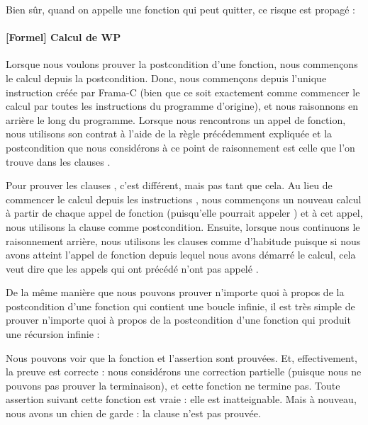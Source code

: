

Bien sûr, quand on appelle une fonction qui peut quitter, ce risque est propagé :




\paragraph*{[Formel] Calcul de WP}


Lorsque nous voulons prouver la postcondition d'une fonction, nous commençons le
calcul depuis la postcondition. Donc, nous commençons depuis l'unique instruction
 créée par Frama-C (bien que ce soit exactement comme
commencer le calcul par toutes les instructions  du programme
d'origine), et nous raisonnons en arrière le long du programme. Lorsque nous
rencontrons un appel de fonction, nous utilisons son contrat à l'aide de la
règle précédemment expliquée et la postcondition que nous considérons à ce
point de raisonnement est celle  que l'on trouve dans les clauses
.


Pour prouver les clauses , c'est différent, mais pas tant que
cela. Au lieu de commencer le calcul depuis les instructions ,
nous commençons un nouveau calcul à partir de chaque appel de fonction
(puisqu'elle pourrait appeler ) et à cet appel, nous utilisons
la clause  comme postcondition. Ensuite, lorsque nous
continuons le raisonnement arrière, nous utilisons les clauses
 comme d'habitude puisque si nous avons atteint l'appel de
fonction depuis lequel nous avons démarré le calcul, cela veut dire que les
appels qui ont précédé n'ont pas appelé .



De la même manière que nous pouvons prouver n'importe quoi à propos de la
postcondition d'une fonction qui contient une boucle infinie, il est très simple
de prouver n'importe quoi à propos de la postcondition d'une fonction qui
produit une récursion infinie :






Nous pouvons voir que la fonction et l'assertion sont prouvées. Et, effectivement,
la preuve est correcte : nous considérons une correction partielle (puisque nous ne
pouvons pas prouver la terminaison), et cette fonction ne termine pas. Toute
assertion suivant cette fonction est vraie : elle est inatteignable. Mais à
nouveau, nous avons un chien de garde : la clause  n'est
pas prouvée.


